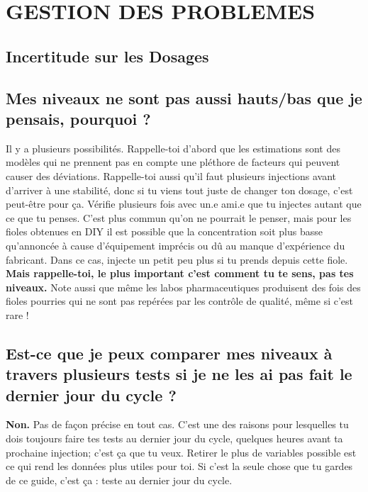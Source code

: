 \documentclass{article}
\begin{document}
\section{GESTION DES PROBLEMES}

\subsection*{Incertitude sur les Dosages}

\subsection{Mes niveaux ne sont pas aussi hauts/bas que je pensais, pourquoi ?}

Il y a plusieurs possibilités. Rappelle-toi d'abord que les estimations sont des modèles qui ne prennent pas en compte une pléthore de facteurs qui peuvent causer des déviations. Rappelle-toi aussi qu'il faut plusieurs injections avant d'arriver à une stabilité, donc si tu viens tout juste de changer ton dosage, c'est peut-être pour ça. Vérifie plusieurs fois avec un.e ami.e que tu injectes autant que ce que tu penses. C'est plus commun qu'on ne pourrait le penser, mais pour les fioles obtenues en DIY il est possible que la concentration soit plus basse qu'annoncée à cause d'équipement imprécis ou dû au manque d'expérience du fabricant. Dans ce cas, injecte un petit peu plus si tu prends depuis cette fiole. \textbf{Mais rappelle-toi, le plus important c'est comment tu te sens, pas tes niveaux.} Note aussi que même les labos pharmaceutiques produisent des fois des fioles pourries qui ne sont pas repérées par les contrôle de qualité, même si c'est rare ! 

\subsection{Est-ce que je peux comparer mes niveaux à travers plusieurs tests si je ne les ai pas fait le dernier jour du cycle ?}

\textbf{Non.} Pas de façon précise en tout cas. C'est une des raisons pour lesquelles tu dois toujours faire tes tests au dernier jour du cycle, quelques heures avant ta prochaine injection; c'est ça que tu veux. Retirer le plus de variables possible est ce qui rend les données plus utiles pour toi. Si c'est la seule chose que tu gardes de ce guide, c'est ça : teste au dernier jour du cycle.
\end{document}
